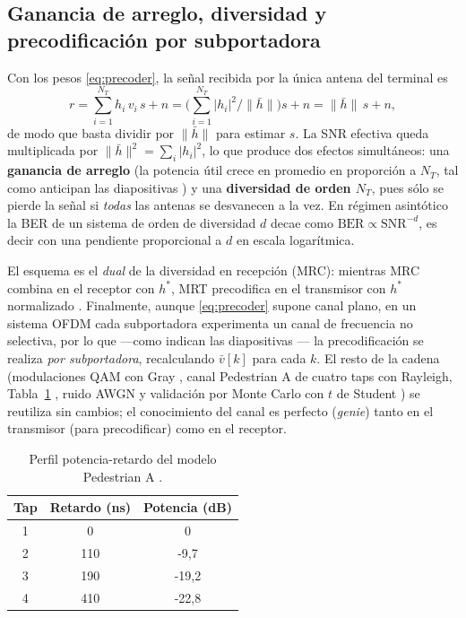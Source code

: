 \documentclass[conference,onecolumn]{IEEEtran}
\begin{document}
\subsection{Ganancia de arreglo, diversidad y precodificaci\'on por subportadora}

Con los pesos \eqref{eq:precoder}, la se\~nal recibida por la \'unica antena del terminal es
\begin{equation}
r=\sum_{i=1}^{N_T} h_i\,v_i\,s + n=\Big(\textstyle\sum_{i=1}^{N_T}\lvert h_i\rvert^{2}\big/\|\bar h\|\Big)s+n=\|\bar h\|\,s+n,
\label{eq:recibido}
\end{equation}
de modo que basta dividir por $\|\bar h\|$ para estimar $s$. La SNR efectiva queda multiplicada por $\|\bar h\|^{2}=\sum_{i}\lvert h_i\rvert^{2}$, lo que produce dos efectos simult\'aneos: una \textbf{ganancia de arreglo} (la potencia \'util crece en promedio en proporci\'on a $N_T$, tal como anticipan las diapositivas \cite{vazquez_cmoviles}) y una \textbf{diversidad de orden $N_T$}, pues s\'olo se pierde la se\~nal si \emph{todas} las antenas se desvanecen a la vez. En r\'egimen asint\'otico la BER de un sistema de orden de diversidad $d$ decae como $\mathrm{BER}\propto\mathrm{SNR}^{-d}$, es decir con una pendiente proporcional a $d$ en escala logar\'itmica.

El esquema es el \emph{dual} de la diversidad en recepci\'on (MRC): mientras MRC combina en el receptor con $h^{*}$, MRT precodifica en el transmisor con $h^{*}$ normalizado \cite{lo1999mrt}. Finalmente, aunque \eqref{eq:precoder} supone canal plano, en un sistema OFDM cada subportadora experimenta un canal de frecuencia no selectiva, por lo que ---como indican las diapositivas \cite{vazquez_cmoviles}--- la precodificaci\'on se realiza \emph{por subportadora}, recalculando $\bar v[k]$ para cada $k$. El resto de la cadena (modulaciones QAM con Gray \cite{proakis2008digital}, canal Pedestrian A de cuatro taps con Rayleigh, Tabla~\ref{tab:pedA} \cite{ituR1225}, ruido AWGN y validaci\'on por Monte Carlo con $t$ de Student \cite{montgomery2011}) se reutiliza sin cambios; el conocimiento del canal es perfecto (\textit{genie}) tanto en el transmisor (para precodificar) como en el receptor.

\begin{table}[H]
    \renewcommand{\arraystretch}{1.2}
    \caption{Perfil potencia-retardo del modelo Pedestrian A \cite{ituR1225}.}
    \label{tab:pedA}
    \centering
    \begin{tabular}{ccc}
        \hline
        \textbf{Tap} & \textbf{Retardo (ns)} & \textbf{Potencia (dB)} \\
        \hline
        1 & 0   & 0       \\
        2 & 110 & -9{,}7  \\
        3 & 190 & -19{,}2 \\
        4 & 410 & -22{,}8 \\
        \hline
    \end{tabular}
\end{table}
\end{document}
